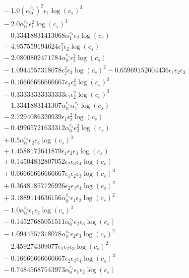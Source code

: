 \documentclass[10pt]{article}
\begin{document}
\begin{align*}
&{}  - 1.0 \left(\alpha_{0}^{c_s}\right)^{2} \epsilon_{1} \log{\left(c_{s} \right)}^{3} \\
&{}  - 2.0 \alpha_{0}^{c_s} \epsilon_{1}^{2} \log{\left(c_{s} \right)}^{3} \\
&{}  - 0.33418831413068 \alpha_{1}^{c_s} \epsilon_{2} \log{\left(c_{s} \right)} \\
&{}  - 4.957559194624 \epsilon_{1}^{2} \epsilon_{2} \log{\left(c_{s} \right)} \\
&{}  - 2.0800802471784 \alpha_{0}^{c_s} \epsilon_{1}^{2} \log{\left(c_{s} \right)} \\
&{}  - 1.0944557318078 \epsilon_{2}^{2} \epsilon_{3} \log{\left(c_{s} \right)}^{2} - 0.65969152604436 \epsilon_{1} \epsilon_{2} \epsilon_{3} \\
&{}  - 0.16666666666667 \epsilon_{2} \epsilon_{3}^{2} \log{\left(c_{s} \right)}^{3} \\
&{}  - 0.33333333333333 \epsilon_{1} \epsilon_{2}^{2} \log{\left(c_{s} \right)}^{3} \\
&{}  - 1.3341883141307 \alpha_{0}^{c_s} \alpha_{1}^{c_s} \log{\left(c_{s} \right)} \\
&{}  - 2.7294086320939 \epsilon_{1} \epsilon_{2}^{2} \log{\left(c_{s} \right)} \\
&{}  - 0.49965721633312 \alpha_{0}^{c_s} \epsilon_{2}^{2} \log{\left(c_{s} \right)} \\
&{}  + 0.5 \alpha_{0}^{c_s} \epsilon_{2} \epsilon_{3} \log{\left(c_{s} \right)}^{3} \\
&{}  + 1.4588172641879 \epsilon_{1} \epsilon_{2} \epsilon_{3} \log{\left(c_{s} \right)} \\
&{}  + 0.14504832807052 \epsilon_{2} \epsilon_{3} \epsilon_{4} \log{\left(c_{s} \right)} \\
&{}  + 0.66666666666667 \epsilon_{1} \epsilon_{2} \epsilon_{3} \log{\left(c_{s} \right)}^{3} \\
&{}  + 0.36481857726926 \epsilon_{2} \epsilon_{3} \epsilon_{4} \log{\left(c_{s} \right)}^{2} \\
&{}  + 3.1889114636156 \alpha_{0}^{c_s} \epsilon_{1} \epsilon_{2} \log{\left(c_{s} \right)}^{2} \\
&{}  - 1.0 \alpha_{0}^{c_s} \epsilon_{1} \epsilon_{2} \log{\left(c_{s} \right)}^{3} \\
&{}  - 0.14527685051511 \alpha_{0}^{c_s} \epsilon_{2} \epsilon_{3} \log{\left(c_{s} \right)} \\
&{}  - 1.0944557318078 \alpha_{0}^{c_s} \epsilon_{2} \epsilon_{3} \log{\left(c_{s} \right)}^{2} \\
&{}  - 2.459274309077 \epsilon_{1} \epsilon_{2} \epsilon_{3} \log{\left(c_{s} \right)}^{2} \\
&{}  - 0.16666666666667 \epsilon_{2} \epsilon_{3} \epsilon_{4} \log{\left(c_{s} \right)}^{3} \\
&{}  - 0.74845687543973 \alpha_{0}^{c_s} \epsilon_{1} \epsilon_{2} \log{\left(c_{s} \right)}
\end{align*}
\end{document}
